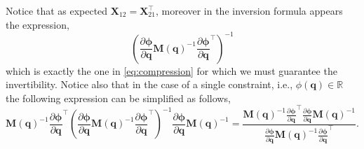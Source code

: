 		Notice that as expected $\bm{X}_{12} = \bm{X}_{21}^{\intercal}$, moreover in the inversion formula appears the expression,
		\begin{equation*}
			\left(\frac{\partial\bm{\phi}}{\partial\bm{q}}\bm{M}(\bm{q})^{-1}\frac{\partial\bm{\phi}}{\partial\bm{q}}^{\intercal}\right)^{-1}
		\end{equation*}
		which is exactly the one in \cref{eq:compression} for which we must guarantee the invertibility. Notice also that in the case of a single constraint, i.e., $\phi(\bm{q})\in\mathbb{R}$ the following expression can be simplified as follows,
		\begin{equation*}
			\bm{M(\bm{q})}^{-1}\frac{\partial\bm{\phi}}{\partial\bm{q}}^{\intercal}\left(\frac{\partial\bm{\phi}}{\partial\bm{q}}\bm{M}(\bm{q})^{-1}\frac{\partial\bm{\phi}}{\partial\bm{q}}^{\intercal}\right)^{-1} \frac{\partial\bm{\phi}}{\partial\bm{q}}\bm{M}(\bm{q})^{-1} = \frac{\bm{M(\bm{q})}^{-1}\frac{\partial\bm{\phi}}{\partial\bm{q}}^{\intercal}\frac{\partial\bm{\phi}}{\partial\bm{q}}\bm{M(\bm{q})}^{-1}}{\frac{\partial\bm{\phi}}{\partial\bm{q}}\bm{M}(\bm{q})^{-1}\frac{\partial\bm{\phi}}{\partial\bm{q}}^{\intercal}}.
		\end{equation*}
			